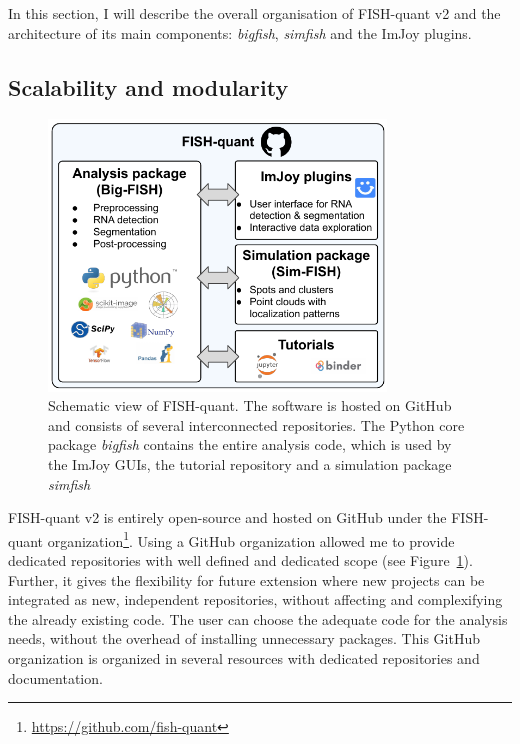 In this section, I will describe the overall organisation of FISH-quant v2 and the architecture of its main components: \emph{bigfish}, \emph{simfish} and the ImJoy plugins.

\subsection{Scalability and modularity}
\label{subsec:framework}

\begin{figure}[]
    \centering
    \includegraphics[width=0.8\textwidth]{figures/chapter1/schema_fishquant}
    \caption[Schematic view of FISH-quant]{Schematic view of FISH-quant.
	The software is hosted on GitHub and consists of several interconnected repositories.
	The Python core package \emph{bigfish} contains the entire analysis code, which is used by the ImJoy GUIs, the tutorial repository and a simulation package \emph{simfish}}
    \label{fig:fishquant}
\end{figure}

FISH-quant v2 is entirely open-source and hosted on GitHub under the FISH-quant organization\footnote{\url{https://github.com/fish-quant}}.
Using a GitHub organization allowed me to provide dedicated repositories with well defined and dedicated scope (see Figure~\ref{fig:fishquant}).
Further, it gives the flexibility for future extension where new projects can be integrated as new, independent repositories, without affecting and complexifying the already existing code.
The user can choose the adequate code for the analysis needs, without the overhead of installing unnecessary packages.
This GitHub organization is organized in several resources with dedicated repositories and documentation.

